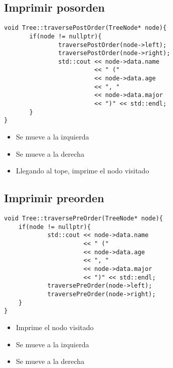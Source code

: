 \documentclass[11pt]{article}
\begin{document}
\subsection{Imprimir posorden}
\label{sec:org241ae15}
\begin{verbatim}
void Tree::traversePostOrder(TreeNode* node){
       if(node != nullptr){
               traversePostOrder(node->left);
               traversePostOrder(node->right);
               std::cout << node->data.name
                         << " ("
                         << node->data.age
                         << ", "
                         << node->data.major
                         << ")" << std::endl;
       }
}
\end{verbatim}
\begin{itemize}
\item Se mueve a la izquierda
\item Se mueve a la derecha
\item Llegando al tope, imprime el nodo visitado
\end{itemize}
\subsection{Imprimir preorden}
\label{sec:org4e82436}
\begin{verbatim}
void Tree::traversePreOrder(TreeNode* node){
    if(node != nullptr){
            std::cout << node->data.name
                      << " ("
                      << node->data.age
                      << ", "
                      << node->data.major
                      << ")" << std::endl;
            traversePreOrder(node->left);
            traversePreOrder(node->right);
    }
}
\end{verbatim}
\begin{itemize}
\item Imprime el nodo visitado
\item Se mueve a la izquierda
\item Se mueve a la derecha
\end{itemize}
\end{document}
